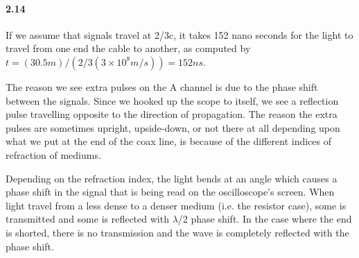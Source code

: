 \documentclass[authoryear, 12pt,5p, times]{elsarticle}
\begin{document}
\paragraph{\textbf{2.14}}
\par  If we assume that signals travel at 2/3c, it takes 152 nano seconds for the light to travel from one end the cable to another, as computed by $ t=(30.5 m)/(2/3(3\times10^8  m/s))=152 ns$.
\par The reason we see extra pulses on the A channel is due to the phase shift between the signals. Since we hooked up the scope to itself, we see a reflection pulse travelling opposite to the direction of propagation. The reason the extra pulses are sometimes upright, upside-down, or not there at all depending upon what we put at the end of the coax line, is because of the different indices of refraction of mediums. 
\par Depending on the refraction index, the light bends at an angle which causes a phase shift in the signal that is being read on the oscilloscope's screen. When light travel from a less dense to a denser medium (i.e. the resistor case), some is transmitted and some is reflected with $\lambda$/2 phase shift. In the case where the end is shorted, there is no transmission and the wave is completely reflected with the phase shift. 
\end{document}
